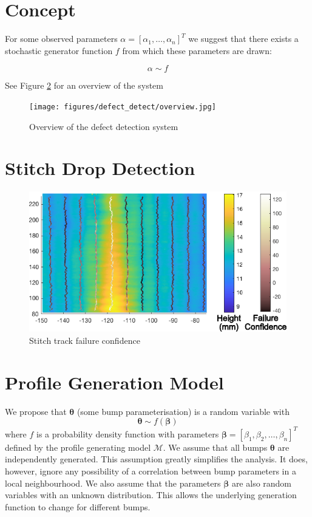 \documentclass[12pt]{report}
\begin{document}
\section{Concept}

For some observed parameters $\alpha = [\alpha_1, \dots, \alpha_n]^T$ we suggest that there exists a stochastic generator function $f$ from which these parameters are drawn:

\[ \alpha \sim f 
\]

See Figure \ref{fig:defect_detect_overview} for an overview of the system

\begin{figure}
    \centering
    \texttt{[image: figures/defect\_detect/overview.jpg]}
    \caption{Overview of the defect detection system}
    \label{fig:defect_detect_overview}
\end{figure}


\section{Stitch Drop Detection}

\begin{figure}
    \centering
    \includegraphics[width=\textwidth]{figures/defect_detect/stitch_failure.pdf}
    \caption{Stitch track failure confidence}
    \label{fig:defect_detect_overview}
\end{figure}



    \section{Profile Generation Model}
        We propose that $\pmb{\theta}$ (some bump parameterisation) is a random variable with
            \[ \pmb{\theta} \sim f(\pmb{\beta}) \]
        where $f$ is a probability density function with parameters $\pmb{\beta} = [\beta_1,\beta_2,\ldots,\beta_n]^T$ defined by the profile generating model $\mathcal{M}$.
        We assume that all bumps $\pmb{\theta}$ are independently generated. This assumption greatly simplifies the analysis. It does, however, ignore any possibility of a correlation between bump parameters in a local neighbourhood. We also assume that the parameters $\pmb{\beta}$ are also random variables with an unknown distribution. This allows the underlying generation function to change for different bumps.
        
\end{document}
